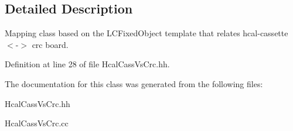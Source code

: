 \subsection{Detailed Description}
Mapping class based on the L\-C\-Fixed\-Object template that relates hcal-\/cassette $<$-\/$>$ crc board. 

Definition at line 28 of file Hcal\-Cass\-Vs\-Crc.\-hh.



The documentation for this class was generated from the following files\-:\begin{DoxyCompactItemize}
\item 
Hcal\-Cass\-Vs\-Crc.\-hh\item 
Hcal\-Cass\-Vs\-Crc.\-cc\end{DoxyCompactItemize}
